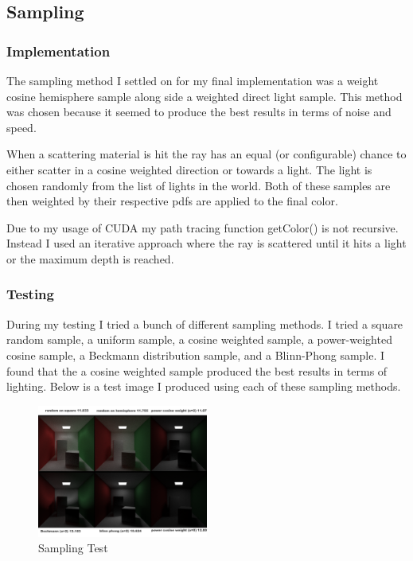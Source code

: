 \documentclass{article}
\begin{document}
    \subsection{Sampling}



        \subsubsection{Implementation}
        The sampling method I settled on for my final implementation was a weight cosine hemisphere sample along side a weighted direct light sample. This method was chosen because it seemed to produce the best results in terms of noise and speed. \par
        When a scattering material is hit the ray has an equal (or configurable) chance to either scatter in a cosine weighted direction or towards a light. The light is chosen randomly from the list of lights in the world. Both of these samples are then weighted by their respective pdfs are applied to the final color. \par
        Due to my usage of CUDA my path tracing function getColor() is not recursive. Instead I used an iterative approach where the ray is scattered until it hits a light or the maximum depth is reached. \par 



        \subsubsection{Testing}
        During my testing I tried a bunch of different sampling methods. I tried a square random sample, a uniform sample, a cosine weighted sample, a power-weighted cosine sample, a Beckmann distribution sample, and a Blinn-Phong sample. I found that the a cosine weighted sample produced the best results in terms of lighting. Below is a test image I produced using each of these sampling methods. \par

        \begin{figure}[h!]
            \centering
            \includegraphics[width=0.5\textwidth]{samples/Lighting_Comparison.png}
            \caption{Sampling Test}
        \end{figure}
\end{document}
